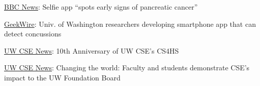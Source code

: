 \href{http://www.bbc.com/news/av/technology-41114587/selfie-app-spots-early-signs-of-pancreatic-cancer}{BBC News}: Selfie app ``spots early signs of pancreatic cancer''

\href{https://www.geekwire.com/2017/univ-washington-researchers-developing-smartphone-app-can-detect-concussions/}{GeekWire}: Univ. of Washington researchers developing smartphone app that can detect concussions

\href{https://news.cs.washington.edu/2016/07/10/10th-anniversary-of-uw-cses-cs4hs/}{UW CSE News}: 10th Anniversary of UW CSE's CS4HS

\href{https://news.cs.washington.edu/2015/09/15/changing-the-world-faculty-and-students-demonstrate-cses-impact-to-the-uw-foundation-board/}{UW CSE News}: Changing the world: Faculty and students demonstrate CSE’s impact to the UW Foundation Board